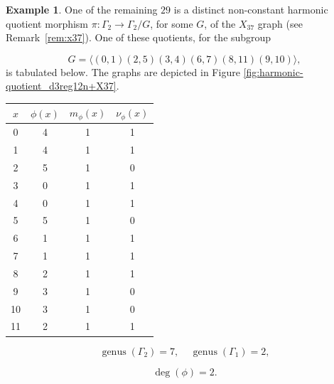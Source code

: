 \documentclass[12pt,letterpaper]{article}
\theoremstyle{definition}
\newtheorem{example}[theorem]{Example}
\DeclareMathOperator{\genus}{genus}
\begin{document}
\begin{example}
{One of the remaining $29$ is a distinct non-constant harmonic quotient
morphism $\pi: \Gamma_2\to \Gamma_2/G$, for some $G$, of
the $X_{37}$ graph (see Remark~\ref{rem:x37}).
One of these quotients, for the subgroup

\[
G=\langle (0,1)(2,5)(3,4)(6,7)(8,11)(9,10) \rangle,
\]
is tabulated below. The graphs are depicted in
Figure \ref{fig:harmonic-quotient_d3reg12n+X37}.

\begin{center}
\begin{tabular}{c|c|c|c}  
  $x$ & $\phi(x)$ & $m_\phi(x)$ & $\nu_\phi(x)$ \\ \hline
  0   &    4   &        1         &  1   \\ 
  1   &    4   &        1         &  1  \\ 
  2   &    5   &        1         &  0  \\ 
  3   &    0   &        1         &  1  \\ 
  4   &    0   &        1         &  1   \\ 
  5   &    5   &        1         &  0  \\ 
  6   &    1   &        1         &  1   \\ 
  7   &    1   &        1         &  1   \\
  8   &    2   &        1         &  1   \\
  9   &    3   &        1         &  0   \\
  10  &    3   &        1         &  0   \\
  11  &    2   &        1         &  1   \\ 
\end{tabular}
\end{center}

\[
  \genus(\Gamma_2) =7,\ \ \ \ \
  \genus(\Gamma_1) =2,
\]

\[
\deg(\phi) =2.
\]

}
\end{example}
\end{document}
